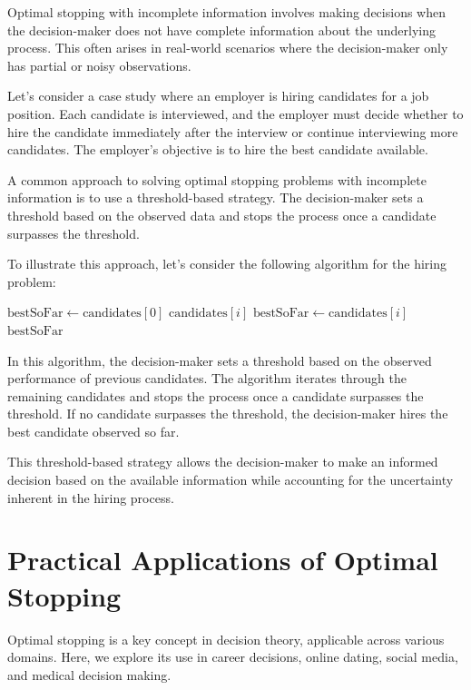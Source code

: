 \documentclass[12pt]{book} %
\begin{document}
Optimal stopping with incomplete information involves making decisions when the decision-maker does not have complete information about the underlying process. This often arises in real-world scenarios where the decision-maker only has partial or noisy observations.

Let's consider a case study where an employer is hiring candidates for a job position. Each candidate is interviewed, and the employer must decide whether to hire the candidate immediately after the interview or continue interviewing more candidates. The employer's objective is to hire the best candidate available.

A common approach to solving optimal stopping problems with incomplete information is to use a threshold-based strategy. The decision-maker sets a threshold based on the observed data and stops the process once a candidate surpasses the threshold.

To illustrate this approach, let's consider the following algorithm for the hiring problem:
\FloatBarrier
\begin{algorithm}
\caption{Optimal Stopping with Incomplete Information}\label{incomplete_info}
\begin{algorithmic}[1]
\State $\text{bestSoFar} \gets \text{candidates}[0]$
        \State \Return $\text{candidates}[i]$
    \EndIf
        \State $\text{bestSoFar} \gets \text{candidates}[i]$
    \EndIf
\EndFor
\State \Return $\text{bestSoFar}$
\EndFunction
\end{algorithmic}
\end{algorithm}
\FloatBarrier
In this algorithm, the decision-maker sets a threshold based on the observed performance of previous candidates. The algorithm iterates through the remaining candidates and stops the process once a candidate surpasses the threshold. If no candidate surpasses the threshold, the decision-maker hires the best candidate observed so far.

This threshold-based strategy allows the decision-maker to make an informed decision based on the available information while accounting for the uncertainty inherent in the hiring process.


\section{Practical Applications of Optimal Stopping}
Optimal stopping is a key concept in decision theory, applicable across various domains. Here, we explore its use in career decisions, online dating, social media, and medical decision making.
\end{document}

